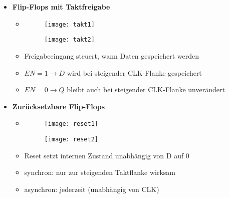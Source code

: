 \begin{itemize}
\item \textbf{Flip-Flops mit Taktfreigabe}
	\begin{itemize}
	\item[]		
				\begin{minipage}{0.25\textwidth}
					\begin{figure}[H]
					\texttt{[image: takt1]}
					\end{figure}
				\end{minipage}
				\begin{minipage}[t]{0.6\textwidth}
					\vspace{-2.25cm}
					\begin{figure}[H]
					\texttt{[image: takt2]}
					\end{figure}
				\end{minipage}
	\end{itemize}
	\begin{itemize}
		\item Freigabeeingang steuert, wann Daten gespeichert werden
		\item $EN = 1 \rightarrow D$ wird bei steigender CLK-Flanke gespeichert
		\item $EN = 0 \rightarrow Q$ bleibt auch bei steigender CLK-Flanke unverändert
 	\end{itemize}
 	
\item \textbf{Zurücksetzbare Flip-Flops}
	\begin{itemize}
	\item[]		
				\begin{minipage}{0.25\textwidth}
					\begin{figure}[H]
					\texttt{[image: reset1]}
					\end{figure}
				\end{minipage}
				\begin{minipage}[t]{0.6\textwidth}
					\vspace{-2.25cm}
					\begin{figure}[H]
					\texttt{[image: reset2]}
					\end{figure}
				\end{minipage}
	\end{itemize}
	\begin{itemize}
		\item Reset setzt internen Zustand unabhängig von D auf 0
		\item synchron: nur zur steigenden Taktflanke wirksam
		\item asynchron: jederzeit (unabhängig von CLK)
 	\end{itemize} 
 
\end{itemize}

